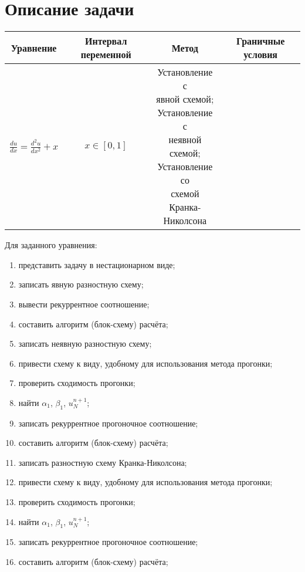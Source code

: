 \documentclass[12pt, a4paper]{report}
\begin{document}
	\section*{Описание задачи}
	\large
	\begin{center}
		\begin{tabular}{||c|c|c|c||}
			\hline
			Уравнение & Интервал переменной & Метод & Граничные условия \\

			\hline
			$ \frac{du}{dx}=\frac{d^{2}u}{dx^{2}}+x$ & $x \in [0, 1]$ & \makecell{Установление с \\ явной схемой; \\ Установление с \\ неявной схемой; \\ Установление со \\ схемой Кранка- \\ Николсона} & \makecell{$ \begin{cases} u(x = 0) = 0 \\ \frac{du}{dx}(x = 1) = 1 \end{cases}$} \\

			\hline
		\end{tabular}
	\end{center}
	\par
	Для заданного уравнения:
	\begin{enumerate}
		\item представить задачу в нестационарном виде;
		\item записать явную разностную схему;
		\item вывести рекуррентное соотношение;
		\item составить алгоритм (блок-схему) расчёта;
		\item записать неявную разностную схему;
		\item привести схему к виду, удобному для использования метода прогонки;
		\item проверить сходимость прогонки;
		\item найти $\alpha_1$, $\beta_1$, $u_{N}^{n+1}$;
		\item записать рекуррентное прогоночное соотношение;
		\item составить алгоритм (блок-схему) расчёта;
		\item записать разностную схему Кранка-Николсона;
		\item привести схему к виду, удобному для использования метода прогонки;
		\item проверить сходимость прогонки;
		\item найти $\alpha_1$, $\beta_1$, $u_{N}^{n+1}$;
		\item записать рекуррентное прогоночное соотношение;
		\item составить алгоритм (блок-схему) расчёта;
	\end{enumerate}
\end{document}
